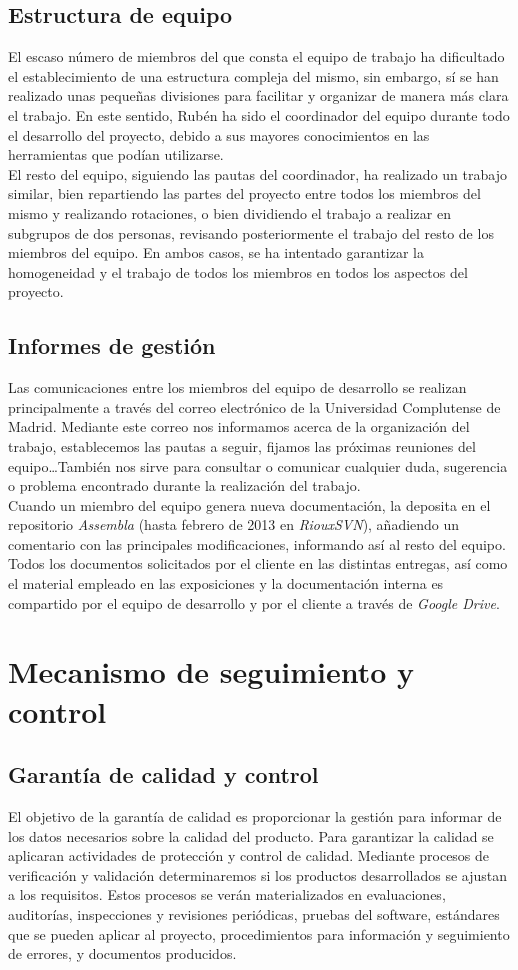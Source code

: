 \documentclass[11pt, a4paper, twoside, titlepage]{article}
\begin{document}
		\subsection{Estructura de equipo}
		El escaso número de miembros del que consta el equipo de trabajo ha dificultado el establecimiento de una estructura compleja del mismo, sin embargo, sí se han realizado unas pequeñas divisiones para facilitar y organizar de manera más clara el trabajo. En este sentido, Rubén ha sido el coordinador del equipo durante todo el desarrollo del proyecto, debido a sus mayores conocimientos en las herramientas que podían utilizarse. \\
		El resto del equipo, siguiendo las pautas del coordinador, ha realizado un trabajo similar, bien repartiendo las partes del proyecto entre todos los miembros del mismo y realizando rotaciones, o bien dividiendo el trabajo a realizar en subgrupos de dos personas, revisando posteriormente el trabajo del resto de los miembros del equipo. En ambos casos, se ha intentado garantizar la homogeneidad y el trabajo de todos los miembros en todos los aspectos del proyecto.
		\subsection{Informes de gestión}
		Las comunicaciones entre los miembros del equipo de desarrollo se realizan principalmente a través del correo electrónico de la Universidad Complutense de Madrid. Mediante este correo nos informamos acerca de la organización del trabajo, establecemos las pautas a seguir, fijamos las próximas reuniones del equipo\ldots También nos sirve para consultar o comunicar cualquier duda, sugerencia o problema encontrado durante la realización del trabajo. \\
		Cuando un miembro del equipo genera	nueva documentación, la deposita en el repositorio \textit{Assembla} (hasta febrero de 2013 en \textit{RiouxSVN}), añadiendo un comentario con las principales modificaciones, informando así al resto del equipo. Todos los documentos solicitados por el cliente en las distintas entregas, así como el material empleado en las exposiciones y la documentación interna es compartido por el equipo de desarrollo y por el cliente a través de \textit{Google Drive}.
	\section{Mecanismo de seguimiento y control}
		\subsection{Garantía de calidad y control}
		El objetivo de la garantía de calidad es proporcionar la gestión para informar de los datos necesarios sobre la calidad del producto. Para garantizar la calidad se aplicaran actividades de protección y control de calidad. Mediante procesos de verificación y validación determinaremos si los productos desarrollados se ajustan a los requisitos. Estos procesos se verán materializados en evaluaciones, auditorías, inspecciones y revisiones periódicas, pruebas del software, estándares que se pueden aplicar al proyecto, procedimientos para información y seguimiento de errores, y documentos producidos.
\end{document}
